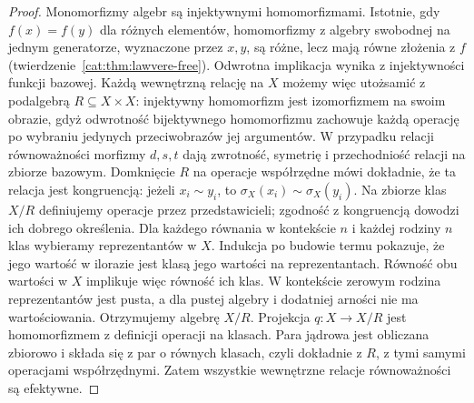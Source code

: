 \begin{proof}
Monomorfizmy algebr są injektywnymi homomorfizmami. Istotnie, gdy $f(x)=f(y)$ dla różnych elementów, homomorfizmy z algebry swobodnej na jednym generatorze, wyznaczone przez $x,y$, są różne, lecz mają równe złożenia z $f$ (twierdzenie~\ref{cat:thm:lawvere-free}). Odwrotna implikacja wynika z injektywności funkcji bazowej. Każdą wewnętrzną relację na $X$ możemy więc utożsamić z podalgebrą $R\subseteq X\times X$: injektywny homomorfizm jest izomorfizmem na swoim obrazie, gdyż odwrotność bijektywnego homomorfizmu zachowuje każdą operację po wybraniu jedynych przeciwobrazów jej argumentów. W przypadku relacji równoważności morfizmy $d,s,t$ dają zwrotność, symetrię i przechodniość relacji na zbiorze bazowym. Domknięcie $R$ na operacje współrzędne mówi dokładnie, że ta relacja jest kongruencją: jeżeli $x_i\sim y_i$, to $\sigma_X(x_i)\sim\sigma_X(y_i)$. Na zbiorze klas $X/R$ definiujemy operacje przez przedstawicieli; zgodność z kongruencją dowodzi ich dobrego określenia. Dla każdego równania w kontekście $n$ i każdej rodziny $n$ klas wybieramy reprezentantów w $X$. Indukcja po budowie termu pokazuje, że jego wartość w ilorazie jest klasą jego wartości na reprezentantach. Równość obu wartości w $X$ implikuje więc równość ich klas. W kontekście zerowym rodzina reprezentantów jest pusta, a dla pustej algebry i dodatniej arności nie ma wartościowania. Otrzymujemy algebrę $X/R$. Projekcja $q:X\to X/R$ jest homomorfizmem z definicji operacji na klasach. Para jądrowa jest obliczana zbiorowo i składa się z par o równych klasach, czyli dokładnie z $R$, z tymi samymi operacjami współrzędnymi. Zatem wszystkie wewnętrzne relacje równoważności są efektywne.
\end{proof}

